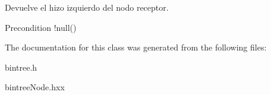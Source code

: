 Devuelve el hizo izquierdo del nodo receptor. 

\begin{DoxyPrecond}{Precondition}
!null() 
\end{DoxyPrecond}


The documentation for this class was generated from the following files\+:\begin{DoxyCompactItemize}
\item 
bintree.\+h\item 
bintree\+Node.\+hxx\end{DoxyCompactItemize}
